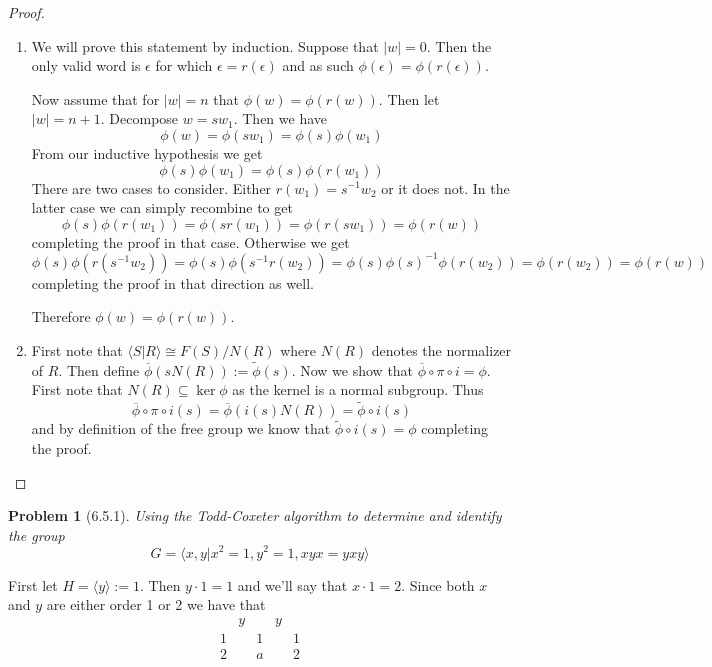 \documentclass[10pt]{article}
\newcommand{\sk}{\vskip 10mm}
\theoremstyle{plain}
\newtheorem{problem}{Problem}
\theoremstyle{remark}
\begin{document}
\begin{proof}
  \begin{enumerate}
  \item We will prove this statement by induction.
    Suppose that $|w|=0$. Then the only valid word is $\epsilon$ for which
    $\epsilon=r(\epsilon)$ and as such $\phi(\epsilon)=\phi(r(\epsilon))$.

    Now assume that for $|w|=n$ that $\phi(w)=\phi(r(w))$. Then let
    $|w|=n+1$. Decompose $w=sw_1$. Then we have
    \[ \phi(w)=\phi(sw_1)=\phi(s)\phi(w_1)\]
    From our inductive hypothesis we get
    \[ \phi(s)\phi(w_1)=\phi(s)\phi(r(w_1)) \]
    There are two cases to consider. Either $r(w_1)=s^{-1}w_2$ or it does not.
    In the latter case we can simply recombine to get
    \[ \phi(s)\phi(r(w_1))=\phi(sr(w_1))=\phi(r(sw_1))=\phi(r(w))\]
    completing the proof in that case. Otherwise we get
    \[ \phi(s)\phi(r(s^{-1}w_2))=\phi(s)\phi(s^{-1}r(w_2))=\phi(s)\phi(s)^{-1}\phi(r(w_2))=\phi(r(w_2))=\phi(r(w))\]
    completing the proof in that direction as well.

    Therefore $\phi(w)=\phi(r(w))$.
  \item First note that $\langle S|R\rangle\cong F(S)/N(R)$ where $N(R)$ denotes the normalizer
    of $R$. Then define $\overline{\phi}(sN(R)):=\tilde{\phi}(s)$. Now we show that
    $\overline{\phi}\circ\pi\circ i=\phi$. First note that $N(R)\subseteq \ker\phi$ as the kernel is a
    normal subgroup. Thus
    \[ \overline{\phi}\circ\pi\circ i(s)=\overline{\phi}(i(s)N(R))= \tilde{\phi}\circ i(s) \]
    and by definition of the free group we know that
    $\tilde{\phi}\circ i(s)=\phi$
    completing the proof.
  \end{enumerate}
\end{proof}

\sk

\begin{problem}[6.5.1]
  Using the Todd-Coxeter algorithm to determine and identify the group
  \[ G = \langle x,y| x^2=1,y^2=1, xyx=yxy\rangle \]
\end{problem}

First let $H=\langle y\rangle:= 1$. Then $y\cdot 1 = 1$ and we'll say that
$x\cdot 1 = 2$. Since both $x$ and $y$ are either order 1 or 2 we
have that
\[
  \begin{array}{ccccc}
    &y&&y&\\
    \hline    
    1 &&1&&1\\
    2&&a&&2\\
  \end{array}
\]
\end{document}
